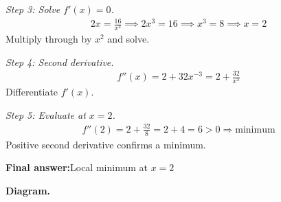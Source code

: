 \documentclass[11pt]{article}
\begin{document}
\textit{Step 3: Solve \( f'(x) = 0 \).}
\[\begin{gathered}
2x = \frac{16}{x^2} \implies 2x^3 = 16 \implies x^3 = 8 \implies x = 2
\end{gathered}\]
Multiply through by \( x^2 \) and solve.

\textit{Step 4: Second derivative.}
\[\begin{gathered}
f''(x) = 2 + 32x^{-3} = 2 + \frac{32}{x^3}
\end{gathered}\]
Differentiate \( f'(x) \).

\textit{Step 5: Evaluate at \( x = 2 \).}
\[\begin{gathered}
f''(2) = 2 + \frac{32}{8} = 2 + 4 = 6 > 0 \Rightarrow \text{minimum}
\end{gathered}\]
Positive second derivative confirms a minimum.

\begin{answerbox}
\textbf{Final answer:}\quad Local minimum at \(\displaystyle  x = 2 \)
\end{answerbox}
\textbf{Diagram.}
\end{document}
